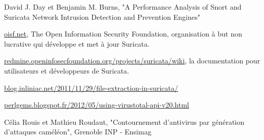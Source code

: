 \documentclass[smallextended]{svjour3}       %
\begin{document}
\begin{thebibliography}{}
%

David J. Day et Benjamin M. Burns, "A Performance Analysis of Snort and Suricata Network Intrusion Detection and Prevention Engines"

\url{oisf.net}, The Open Information Security Foundation, organisation à but non lucrative qui développe et met à jour Suricata.

\url{redmine.openinfosecfoundation.org/projects/suricata/wiki}, la documentation pour utilisateurs et développeurs de Suricata.

\url{blog.inliniac.net/2011/11/29/file-extraction-in-suricata/}

\url{perlgems.blogspot.fr/2012/05/using-virustotal-api-v20.html}

Célia Rouis et Mathieu Roudaut, "Contournement d'antivirus par génération d'attaques caméléon", Grenoble INP - Ensimag


\end{thebibliography}
\end{document}
